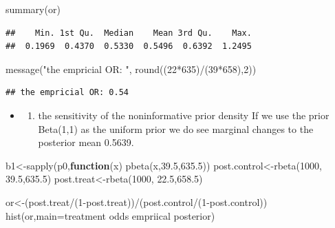 \documentclass[
]{book}
\newenvironment{Shaded}{\begin{snugshade}}{\end{snugshade}}
\newcommand{\AttributeTok}[1]{\textcolor[rgb]{0.77,0.63,0.00}{#1}}
\newcommand{\ControlFlowTok}[1]{\textcolor[rgb]{0.13,0.29,0.53}{\textbf{#1}}}
\newcommand{\DecValTok}[1]{\textcolor[rgb]{0.00,0.00,0.81}{#1}}
\newcommand{\FloatTok}[1]{\textcolor[rgb]{0.00,0.00,0.81}{#1}}
\newcommand{\FunctionTok}[1]{\textcolor[rgb]{0.00,0.00,0.00}{#1}}
\newcommand{\NormalTok}[1]{#1}
\newcommand{\OtherTok}[1]{\textcolor[rgb]{0.56,0.35,0.01}{#1}}
\newcommand{\SpecialCharTok}[1]{\textcolor[rgb]{0.00,0.00,0.00}{#1}}
\newcommand{\StringTok}[1]{\textcolor[rgb]{0.31,0.60,0.02}{#1}}
\providecommand{\tightlist}{%
  \setlength{\itemsep}{0pt}\setlength{\parskip}{0pt}}
\theoremstyle{definition}
\theoremstyle{definition}
\theoremstyle{definition}
\theoremstyle{definition}
\theoremstyle{remark}
\begin{document}
\begin{Shaded}
\begin{Highlighting}[]
  \FunctionTok{summary}\NormalTok{(or)}
\end{Highlighting}
\end{Shaded}

\begin{verbatim}
##    Min. 1st Qu.  Median    Mean 3rd Qu.    Max. 
##  0.1969  0.4370  0.5330  0.5496  0.6392  1.2495
\end{verbatim}

\begin{Shaded}
\begin{Highlighting}[]
  \FunctionTok{message}\NormalTok{(}\StringTok{"the empricial OR: "}\NormalTok{, }\FunctionTok{round}\NormalTok{((}\DecValTok{22}\SpecialCharTok{*}\DecValTok{635}\NormalTok{)}\SpecialCharTok{/}\NormalTok{(}\DecValTok{39}\SpecialCharTok{*}\DecValTok{658}\NormalTok{),}\DecValTok{2}\NormalTok{))}
\end{Highlighting}
\end{Shaded}

\begin{verbatim}
## the empricial OR: 0.54
\end{verbatim}

\begin{itemize}
\item
  \begin{enumerate}
  \def\labelenumi{(\alph{enumi})}
  \setcounter{enumi}{2}
  \tightlist
  \item
    the sensitivity of the noninformative prior density
    If we use the prior Beta(1,1) as the uniform prior we do see marginal changes to the posterior mean 0.5639.
  \end{enumerate}
\end{itemize}

\begin{Shaded}
\begin{Highlighting}[]
\NormalTok{b1}\OtherTok{\textless{}{-}}\FunctionTok{sapply}\NormalTok{(p0,}\ControlFlowTok{function}\NormalTok{(x) }\FunctionTok{pbeta}\NormalTok{(x,}\FloatTok{39.5}\NormalTok{,}\FloatTok{635.5}\NormalTok{))}
\NormalTok{ post.control}\OtherTok{\textless{}{-}}\FunctionTok{rbeta}\NormalTok{(}\DecValTok{1000}\NormalTok{, }\FloatTok{39.5}\NormalTok{,}\FloatTok{635.5}\NormalTok{)}
\NormalTok{  post.treat}\OtherTok{\textless{}{-}}\FunctionTok{rbeta}\NormalTok{(}\DecValTok{1000}\NormalTok{, }\FloatTok{22.5}\NormalTok{,}\FloatTok{658.5}\NormalTok{)}

\NormalTok{  or}\OtherTok{\textless{}{-}}\NormalTok{(post.treat}\SpecialCharTok{/}\NormalTok{(}\DecValTok{1}\SpecialCharTok{{-}}\NormalTok{post.treat))}\SpecialCharTok{/}\NormalTok{(post.control}\SpecialCharTok{/}\NormalTok{(}\DecValTok{1}\SpecialCharTok{{-}}\NormalTok{post.control))}
  \FunctionTok{hist}\NormalTok{(or,}\AttributeTok{main=}\StringTok{\textquotesingle{}treatment odds empriical posterior\textquotesingle{}}\NormalTok{)}
\end{Highlighting}
\end{Shaded}
\end{document}
